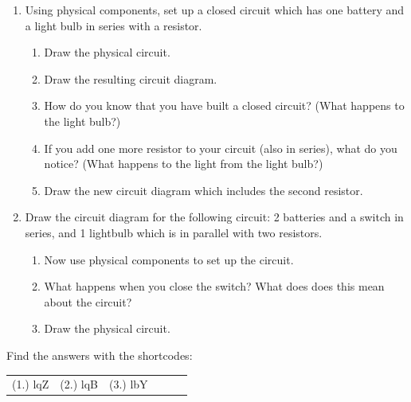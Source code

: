 \begin{enumerate}[noitemsep, label=\textbf{\arabic*}. ]
         \label{m38771*uid24}\item Using physical components, set up a closed circuit which has one battery and a light bulb in series with a resistor.
\label{m38771*id63631}\begin{enumerate}[noitemsep, label=\textbf{\alph*}. ] 
            \label{m38771*uid25}\item Draw the physical circuit.
\label{m38771*uid26}\item Draw the resulting circuit diagram.
\label{m38771*uid27}\item How do you know that you have built a closed circuit? (What happens to the light bulb?)
\label{m38771*uid28}\item If you add one more resistor to your circuit (also in series), what do you notice? (What happens to the light from the light bulb?)
\label{m38771*uid29}\item Draw the new circuit diagram which includes the second resistor.
\end{enumerate}
                    \label{m38771*uid30}\item Draw the circuit diagram for the following circuit: 2 batteries and a switch in series, and 1 lightbulb which is in parallel with two resistors.
\label{m38771*id63711}\begin{enumerate}[noitemsep, label=\textbf{\alph*}. ] 
            \label{m38771*uid31}\item Now use physical components to set up the circuit.
\label{m38771*uid32}\item What happens when you close the switch? What does does this mean about the circuit?
\label{m38771*uid33}\item Draw the physical circuit.
\end{enumerate}
                  \end{enumerate}
        
          

\label{m38771*secfhsst!!!underscore!!!id369}
\par {} Find the answers with the shortcodes:
 \par \begin{tabular}[h]{cccccc}
 (1.) lqZ  &  (2.) lqB  &  (3.) lbY  & \end{tabular}



